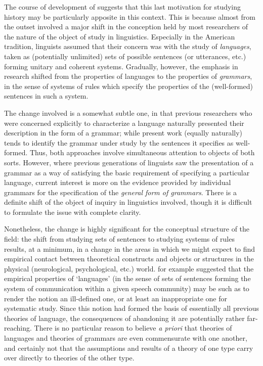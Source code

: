 The course of development of  suggests that this
last motivation for studying history may be particularly apposite in
this context.  This is because  almost from the
outset involved a major shift in the conception held by most
researchers of the nature of the object of study in linguistics.
Especially in the American tradition, linguists assumed that their
concern was with the study of \textit{languages}, taken as
(potentially unlimited) sets of possible sentences (or utterances,
etc.) forming unitary and coherent systems. Gradually, however, the
emphasis in research shifted from the properties of languages to the
properties of \textit{grammars}, in the sense of systems of {rules}
which specify the properties of the (well-formed) sentences in such a
system.

The {change} involved is a somewhat subtle one, in that previous
researchers who were concerned explicitly to characterize a
language naturally presented their description in the form of a
grammar; while present work (equally naturally) tends to identify the
grammar under study by the sentences it specifies as well-formed.
Thus, both approaches involve simultaneous attention to objects of
both sorts. However, where previous generations of linguists saw the
presentation of a grammar as a way of satisfying the basic requirement
of specifying a particular language, current interest is more on the
evidence provided by individual grammars for the specification of the
\emph{general form of grammars}.  There is a definite shift of the
object of inquiry in linguistics involved, though it is difficult to
formulate the issue with complete clarity.

Nonetheless, the {change} is highly significant for the conceptual
structure of the field: the shift from studying sets of sentences to
studying systems of {rules} results, at a minimum, in a {change} in the
areas in which we might expect to find empirical contact between
theoretical constructs and objects or structures in the physical
(neurological, psychological, etc.)
world. \citet{chomsky81:rules.and.representations} for example
suggested that the empirical properties of `languages' (in the sense
of sets of sentences forming the system of communication within a
given speech community) may be such as to render the notion an
ill-defined one, or at least an inappropriate one for systematic
study.  Since this notion had formed the basis of essentially all
previous theories of language, the consequences of abandoning it are
potentially rather far-reaching.  There is no particular reason to
believe \emph{a priori} that theories of languages and theories of
grammars are even commensurate with one another, and certainly not
that the assumptions and results of a theory of one type carry over
directly to theories of the other type.


